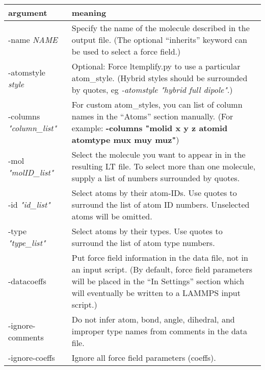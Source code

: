 \documentclass[11pt]{article}
\begin{document}
\begin{tabular}[h]{l|p{10cm}}
\textbf{argument} & \textbf{meaning}
\\
\hline
\hline

-name \textit{NAME}  &
Specify the name of the molecule described in the output file.
(The optional ``inherits'' keyword can be used to select a force field.)
\\
\hline

-atomstyle \textit{style}
&
Optional: Force ltemplify.py to use a particular atom\_style.
(Hybrid styles should be surrounded by quotes, eg
\textit{-atomstyle "hybrid full dipole"}.)
\\
\hline

-columns \textit{"column\_list"}  &
For custom atom\_styles, you can list of column names in the ``Atoms''
section manually.
(For example: \textbf{-columns "molid x y z atomid atomtype mux muy muz"})
\\
\hline

-mol \textit{"molID\_list"}
&
Select the molecule you want to appear in in the resulting LT file.
To select more than one molecule, supply a list of numbers surrounded
by quotes.
\\
\hline

-id \textit{"id\_list"}
&
Select atoms by their atom-IDs.
Use quotes to surround the list of atom ID numbers.
Unselected atoms will be omitted.
\\
\hline

-type \textit{"type\_list"}
&
Select atoms by their types.
Use quotes to surround the list of atom type numbers.
\\
\hline

-datacoeffs
&
Put force field information in the data file, not in an input script.
(By default, force field parameters will be placed in the ``In Settings''
 section which will eventually be written to a LAMMPS input script.)
\\
\hline

-ignore-comments
&
Do not infer atom, bond, angle, dihedral, and improper type names
from comments in the data file.
\\
\hline

-ignore-coeffs
&
Ignore all force field parameters (coeffs).
\\
\hline


\end{tabular}
\end{document}
